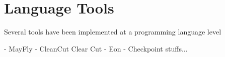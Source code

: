 \section{Language Tools} %
\label{sec:language_tools}

Several tools have been implemented at a programming language level

- MayFly
- CleanCut   Clear Cut \cite{cleancut}
- Eon
- Checkpoint stuffs...

